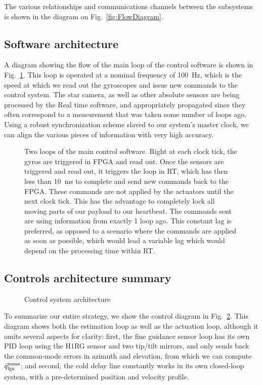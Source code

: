 The various relationships and communications channels between the subsystems is shown in the diagram on Fig.~\ref{fig:FlowDiagram}.



\subsection{Software architecture}

A diagram showing the flow of the main loop of the control software is shown in Fig.~\ref{fig:SoftwareFlow}. This loop is operated at a nominal frequency of \SI{100}{\hertz}, which is the speed at which we read out the gyroscopes and issue new commands to the control system. The star camera, as well as other absolute sensors are being processed by the Real time software, and appropriately propagated since they often correspond to a measurement that was taken some number of loops ago. Using a robust synchronization scheme slaved to our system's master clock, we can align the various pieces of information with very high accuracy.

\begin{figure}[!h]
	\centering
	
	\caption[Software diagram]{Two loops of the main control software. Right at each clock tick, the gyros are triggered in \boop FPGA and read out. Once the sensors are triggered and read out, it triggers the loop in \boop RT,  which has then less than \SI{10}{\milli\second} to complete and send new commands back to the \boop FPGA. These commands are not applied by the actuators until the next clock tick. This has the advantage to completely lock all moving parts of our payload to our heartbeat. The commands sent are using information from exactly 1 loop ago. This constant lag is preferred, as opposed to a scenario where the commands are applied as soon as possible, which would lead a variable lag which would depend on the processing time within \boop RT.}
	\label{fig:SoftwareFlow}
    \end{figure}
    
    

\subsection{Controls architecture summary}

\begin{figure}[!h]
	\centering
	
	\caption[Control System Design]{Control system architecture}
	\label{fig:ControlSystem}
    \end{figure}

To summarize our entire strategy, we show the control diagram in Fig.~\ref{fig:ControlSystem}. This diagram shows both the estimation loop as well as the actuation loop, although it omits several aspects for clarity: first, the fine guidance sensor loop has its own PID loop using the H1RG sensor and two tip/tilt mirrors, and only sends back the common-mode errors in azimuth and elevation, from which we can compute $\bar{q}^\textrm{meas}_\textrm{fgs}$; and second, the cold delay line constantly works in its own closed-loop system, with a pre-determined position and velocity profile.



